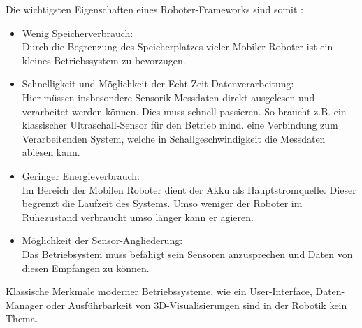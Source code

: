 \documentclass[a4paper,cleardoubleempty,BCOR1cm]{book}
\begin{document}
Die wichtigsten Eigenschaften eines Roboter-Frameworks sind somit :
\begin{itemize}
	\item Wenig Speicherverbrauch:\\
			Durch die Begrenzung des Speicherplatzes vieler Mobiler Roboter ist ein kleines Betriebssystem zu bevorzugen. 
	\item Schnelligkeit und Möglichkeit der Echt-Zeit-Datenverarbeitung: \\
			Hier müssen insbesondere Sensorik-Messdaten direkt ausgelesen und verarbeitet werden können. Dies muss schnell passieren. So braucht z.B. ein klassischer Ultraschall-Sensor für den Betrieb mind. eine Verbindung zum Verarbeitenden System, welche in Schallgeschwindigkeit die Messdaten ablesen kann. 
	\item Geringer Energieverbrauch:\\
			Im Bereich der Mobilen Roboter dient der Akku als Hauptstromquelle. Dieser begrenzt die Laufzeit des Systems. Umso weniger der Roboter im Ruhezustand verbraucht umso länger kann er agieren. 
	\item Möglichkeit der Sensor-Angliederung:\\
			Das Betriebsystem muss befähigt sein Sensoren anzusprechen und Daten von diesen Empfangen zu können.
\end{itemize}

Klassische Merkmale moderner Betriebssysteme, wie ein User-Interface, Daten-Manager oder Ausführbarkeit von 3D-Visualisierungen sind in der Robotik kein Thema. 
\end{document}
